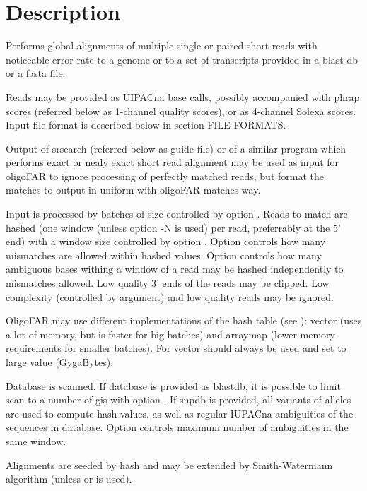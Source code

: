 \documentclass[english]{article}
\begin{document}
\section{Description}
    Performs global alignments of multiple single or paired short reads 
    with noticeable error rate to a genome or to a set of transcripts 
    provided in a blast-db or a fasta file.

    Reads may be provided as UIPACna base calls, possibly accompanied 
    with phrap scores (referred below as 1-channel quality scores), 
    or as 4-channel Solexa scores. Input file format is described 
    below in section FILE FORMATS.

    Output of srsearch (referred below as guide-file) or of a similar 
    program which performs exact or nealy exact short read alignment
    may be used as input for oligoFAR to ignore processing of perfectly 
    matched reads, but format the matches to output in uniform with
    oligoFAR matches way.

    Input is processed by batches of size controlled by option . 
    Reads to match are hashed (one window (unless option -N is used) per read, 
    preferrably at the 5' end) with a window size controlled by option . 
    Option  controls how many mismatches are allowed within hashed values.  
    Option  controls how many ambiguous bases withing a window of a read 
    may be hashed independently to mismatches allowed. Low quality 3' ends 
    of the reads may be clipped.  Low complexity (controlled by  argument) 
    and low quality reads may be ignored.

    OligoFAR may use different implementations of the hash table (see ):
    vector (uses a lot of memory, but is faster for big batches) and
    arraymap (lower memory requirements for smaller batches). 
    For vector  should always be used and set to large value (GygaBytes).

    Database is scanned. If database is provided as blastdb, it is 
    possible to limit scan to a number of gis with option . If snpdb is
    provided, all variants of alleles are used to compute hash values, as well
    as regular IUPACna ambiguities of the sequences in database. Option 
    controls maximum number of ambiguities in the same window.

    Alignments are seeded by hash and may be extended by Smith-Watermann
    algorithm (unless  or  is used).
\end{document}
